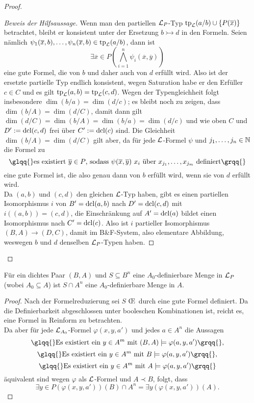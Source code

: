 \begin{proof}
\begin{proof}[Beweis der Hilfsaussage]
		Wenn man den partiellen $\mathcal{L}_P$-Typ $\operatorname{tp}_{\mathcal{L}}(a/b)\cup\{P(\overline{x})\}$ betrachtet, bleibt er konsistent unter der Ersetzung $b\rightarrowtail d$ in den Formeln. Seien nämlich $\psi_1(\overline{x},b),\dots,\psi_n(\overline{x},b)\in\operatorname{tp}_{\mathcal{L}}(a/b)$, dann ist $$\exists\overline{x}\in P(\bigwedge\limits_{i=1}^n\psi_i(\overline{x},\overline{y}))$$ eine gute Formel, die von $b$ und daher auch von $d$ erfüllt wird. Also ist der ersetzte partielle Typ endlich konsistent, wegen Saturation habe er den Erfüller $c\in C$ und es gilt $\operatorname{tp}_{\mathcal{L}}(a,b)=\operatorname{tp}_{\mathcal{L}}(c,d)$. Wegen der Typengleichheit folgt insbesondere $\dim(b/a)=\dim(d/c)$; es bleibt noch zu zeigen, dass $\dim(b/A)=\dim(d/C)$, damit dann gilt $\dim(d/C)=\dim(b/A)=\dim(b/a)=\dim(d/c)$ und wie oben $C$ und $D':=\operatorname{dcl}(c,d)$ frei über $C':=\operatorname{dcl}(c)$ sind. Die Gleichheit $\dim(b/A)=\dim(d/C)$ gilt aber, da für jede $\mathcal{L}$-Formel $\psi$ und $j_1,\dots,j_n\in\mathbb{N}$ die Formel zu $$\glqq{}\text{es existiert }\overline{y}\in P\text{, sodass }\psi(\overline{x},\overline{y})\ x_i\text{ über }x_{j_1},\dots,x_{j_m}\text{ definiert}\grqq{}$$ eine gute Formel ist, die also genau dann von $b$ erfüllt wird, wenn sie von $d$ erfüllt wird.\\
		Da $(a,b)$ und $(c,d)$ den gleichen $\mathcal{L}$-Typ haben, gibt es einen partiellen Isomorphismus $i$ von $B'=\operatorname{dcl}(a,b)$ nach $D'=\operatorname{dcl}(c,d)$ mit $i((a,b))=(c,d)$, die Einschränkung auf $A'=\operatorname{dcl}(a)$ bildet einen Isomorphismus nach $C'=\operatorname{dcl}(c)$. Also ist $i$ partieller Isomorphismus $(B,A)\rightarrow(D,C)$, damit im B\&F-System, also elementare Abbildung, weswegen $b$ und $d$ denselben $\mathcal{L}_P$-Typen haben.
	\end{proof}
\end{proof}

\begin{corollary}
	Für ein dichtes Paar $(B,A)$ und $S\subseteq B^n$ eine $A_0$-definierbare Menge in $\mathcal{L}_P$ (wobei $A_0\subseteq A$) ist $S\cap A^n$ eine $A_0$-definierbare Menge in $A$.
\end{corollary}
\begin{proof}
	Nach der Formelreduzierung sei $S$ \OE\ durch eine gute Formel definiert. Da die Definierbarkeit abgeschlossen unter booleschen Kombinationen ist, reicht es, eine Formel in Reinform zu betrachten.\\
	Da aber für jede $\mathcal{L}_{A_0}$-Formel $\varphi(x,y,a')$ und jedes $a\in A^n$ die Aussagen $$\glqq{}\text{Es existiert ein }y\in A^m\text{ mit }(B,A)\models\varphi(a,y,a')\grqq{},$$ $$\glqq{}\text{Es existiert ein }y\in A^m\text{ mit }B\models\varphi(a,y,a')\grqq{},$$ $$\glqq{}\text{Es existiert ein }y\in A^m\text{ mit }A\models\varphi(a,y,a')\grqq{}$$ äquivalent sind wegen $\varphi$ als $\mathcal{L}$-Formel und $A\prec B$, folgt, dass $$\exists y\in P(\varphi(x,y,a'))(B)\cap A^n=\exists y(\varphi(x,y,a'))(A).$$
\end{proof}

